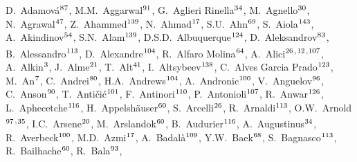 


\begingroup
\small
\begin{flushleft}
D.~Adamov\'{a}$^\textrm{\scriptsize 87}$,
M.M.~Aggarwal$^\textrm{\scriptsize 91}$,
G.~Aglieri Rinella$^\textrm{\scriptsize 34}$,
M.~Agnello$^\textrm{\scriptsize 30}$,
N.~Agrawal$^\textrm{\scriptsize 47}$,
Z.~Ahammed$^\textrm{\scriptsize 139}$,
N.~Ahmad$^\textrm{\scriptsize 17}$,
S.U.~Ahn$^\textrm{\scriptsize 69}$,
S.~Aiola$^\textrm{\scriptsize 143}$,
A.~Akindinov$^\textrm{\scriptsize 54}$,
S.N.~Alam$^\textrm{\scriptsize 139}$,
D.S.D.~Albuquerque$^\textrm{\scriptsize 124}$,
D.~Aleksandrov$^\textrm{\scriptsize 83}$,
B.~Alessandro$^\textrm{\scriptsize 113}$,
D.~Alexandre$^\textrm{\scriptsize 104}$,
R.~Alfaro Molina$^\textrm{\scriptsize 64}$,
A.~Alici$^\textrm{\scriptsize 26}$\textsuperscript{,}$^\textrm{\scriptsize 12}$\textsuperscript{,}$^\textrm{\scriptsize 107}$,
A.~Alkin$^\textrm{\scriptsize 3}$,
J.~Alme$^\textrm{\scriptsize 21}$,
T.~Alt$^\textrm{\scriptsize 41}$,
I.~Altsybeev$^\textrm{\scriptsize 138}$,
C.~Alves Garcia Prado$^\textrm{\scriptsize 123}$,
M.~An$^\textrm{\scriptsize 7}$,
C.~Andrei$^\textrm{\scriptsize 80}$,
H.A.~Andrews$^\textrm{\scriptsize 104}$,
A.~Andronic$^\textrm{\scriptsize 100}$,
V.~Anguelov$^\textrm{\scriptsize 96}$,
C.~Anson$^\textrm{\scriptsize 90}$,
T.~Anti\v{c}i\'{c}$^\textrm{\scriptsize 101}$,
F.~Antinori$^\textrm{\scriptsize 110}$,
P.~Antonioli$^\textrm{\scriptsize 107}$,
R.~Anwar$^\textrm{\scriptsize 126}$,
L.~Aphecetche$^\textrm{\scriptsize 116}$,
H.~Appelsh\"{a}user$^\textrm{\scriptsize 60}$,
S.~Arcelli$^\textrm{\scriptsize 26}$,
R.~Arnaldi$^\textrm{\scriptsize 113}$,
O.W.~Arnold$^\textrm{\scriptsize 97}$\textsuperscript{,}$^\textrm{\scriptsize 35}$,
I.C.~Arsene$^\textrm{\scriptsize 20}$,
M.~Arslandok$^\textrm{\scriptsize 60}$,
B.~Audurier$^\textrm{\scriptsize 116}$,
A.~Augustinus$^\textrm{\scriptsize 34}$,
R.~Averbeck$^\textrm{\scriptsize 100}$,
M.D.~Azmi$^\textrm{\scriptsize 17}$,
A.~Badal\`{a}$^\textrm{\scriptsize 109}$,
Y.W.~Baek$^\textrm{\scriptsize 68}$,
S.~Bagnasco$^\textrm{\scriptsize 113}$,
R.~Bailhache$^\textrm{\scriptsize 60}$,
R.~Bala$^\textrm{\scriptsize 93}$,

\end{flushleft}
